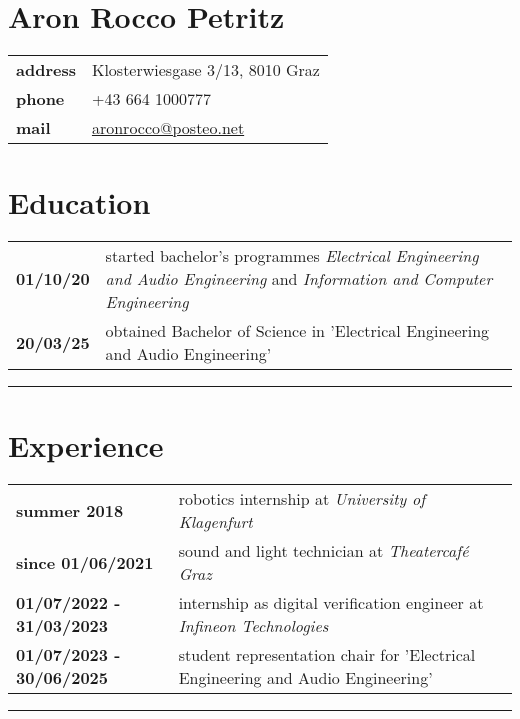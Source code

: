 \documentclass[12pt]{article}
\begin{document}
\section*{\raggedleft \huge Aron Rocco Petritz}

\vspace{1em}
\begin{tabular}{l l}
	\bf{address} & Klosterwiesgase 3/13, 8010 Graz\\
	\bf{phone} & +43 664 1000777\\
	\bf{mail} & \href{mailto:aronrocco@posteo.net}{aronrocco@posteo.net}\\
\end{tabular}

\hfill

\section*{Education}

\normalsize
\begin{tabular}{l p{}}
	\bf 01/10/20 & \normalfont started bachelor's programmes \textit{Electrical Engineering and Audio Engineering} \normalfont and \textit{Information and Computer Engineering} \\
	\bf 20/03/25 & \normalfont obtained Bachelor of Science in 'Electrical Engineering and Audio Engineering'
\end{tabular}

\vspace{1em}
\hrule
\vspace{-0.5em}
\section*{Experience}
\begin{tabular}{l p{}}
	\bf summer 2018 & robotics internship at \textit{University of Klagenfurt}\\
	\bf since 01/06/2021 & sound and light technician at \textit{Theatercafé Graz}\\
	\bf 01/07/2022 - 31/03/2023 & internship as digital verification engineer at \textit{Infineon Technologies}\\
	\bf 01/07/2023 - 30/06/2025 & student representation chair for 'Electrical Engineering and Audio Engineering'
\end{tabular}

\vspace{1em}
\hrule
\vspace{1em}
\end{document}
